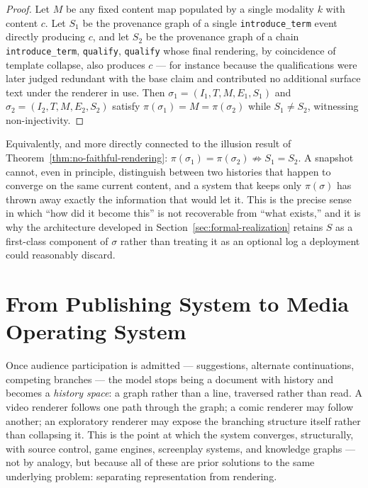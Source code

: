 \documentclass[11pt]{article}
\theoremstyle{definition}
\begin{document}
\begin{proof}
Let $M$ be any fixed content map populated by a single modality $k$ with content $c$. Let $S_1$ be the provenance graph of a single \texttt{introduce\_term} event directly producing $c$, and let $S_2$ be the provenance graph of a chain \texttt{introduce\_term}, \texttt{qualify}, \texttt{qualify} whose final rendering, by coincidence of template collapse, also produces $c$ --- for instance because the qualifications were later judged redundant with the base claim and contributed no additional surface text under the renderer in use. Then $\sigma_1 = (I_1, T, M, E_1, S_1)$ and $\sigma_2 = (I_2, T, M, E_2, S_2)$ satisfy $\pi(\sigma_1) = M = \pi(\sigma_2)$ while $S_1 \neq S_2$, witnessing non-injectivity.
\end{proof}

Equivalently, and more directly connected to the illusion result of Theorem~\ref{thm:no-faithful-rendering}: $\pi(\sigma_1) = \pi(\sigma_2) \not\Rightarrow S_1 = S_2$. A snapshot cannot, even in principle, distinguish between two histories that happen to converge on the same current content, and a system that keeps only $\pi(\sigma)$ has thrown away exactly the information that would let it. This is the precise sense in which ``how did it become this'' is not recoverable from ``what exists,'' and it is why the architecture developed in Section~\ref{sec:formal-realization} retains $S$ as a first-class component of $\sigma$ rather than treating it as an optional log a deployment could reasonably discard.

\section{From Publishing System to Media Operating System}
\label{sec:media-os}

Once audience participation is admitted --- suggestions, alternate continuations, competing branches --- the model stops being a document with history and becomes a \emph{history space}: a graph rather than a line, traversed rather than read. A video renderer follows one path through the graph; a comic renderer may follow another; an exploratory renderer may expose the branching structure itself rather than collapsing it. This is the point at which the system converges, structurally, with source control, game engines, screenplay systems, and knowledge graphs --- not by analogy, but because all of these are prior solutions to the same underlying problem: separating representation from rendering.
\end{document}
